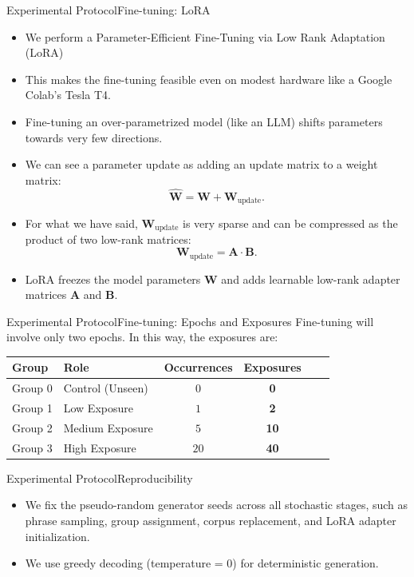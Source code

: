 \documentclass[10pt,aspectratio=43
	]{beamer}
\begin{document}
	\begin{frame}{Experimental Protocol}{Fine-tuning: LoRA}
        \begin{itemize}
            \item We perform a Parameter-Efficient Fine-Tuning via Low Rank Adaptation (LoRA)
            \item This makes the fine-tuning feasible even on modest hardware like a Google Colab's Tesla T4.
            \item Fine-tuning an over-parametrized model (like an LLM) shifts parameters towards very few directions.
            \item We can see a parameter update as adding an update matrix to a weight matrix: $$\hat{\mathbf{W}} = \mathbf{W} + \mathbf{W}_{\text{update}}.$$
            \item For what we have said, $\mathbf{W}_{\text{update}}$ is very sparse and can be compressed as the product of two low-rank matrices: $$\mathbf{W}_{\text{update}} = \mathbf{A}\cdot \mathbf{B}.$$
            \item LoRA freezes the model parameters $\mathbf{W}$ and adds learnable low-rank adapter matrices $\mathbf{A}$ and $\mathbf{B}$.
        \end{itemize}
    \end{frame}

	\begin{frame}{Experimental Protocol}{Fine-tuning: Epochs and Exposures}
        Fine-tuning will involve only two epochs. In this way, the exposures are:
		\begin{table}
			\centering
			\footnotesize
			\begin{tabular}{llcccc}
				\toprule
				\textbf{Group} & \textbf{Role} & \textbf{Occurrences} & \textbf{Exposures} \\
				\midrule
				Group 0 & Control (Unseen) & $0$ & \textbf{0} \\
				Group 1 & Low Exposure     & $1$ & \textbf{2} \\
				Group 2 & Medium Exposure  & $5$ & \textbf{10} \\
                Group 3 & High Exposure    & $20$ & \textbf{40} \\
				\bottomrule
			\end{tabular}
		\end{table}
    \end{frame}

    \begin{frame}{Experimental Protocol}{Reproducibility}
        \begin{itemize}
            \item We fix the pseudo-random generator seeds across all stochastic stages, such as phrase sampling, group assignment, corpus replacement, and LoRA adapter initialization.
            \item We use greedy decoding (temperature = 0) for deterministic generation.
        \end{itemize}
    \end{frame}
\end{document}
